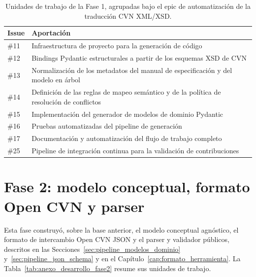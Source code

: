 \begin{table}[htbp]
  \centering
  \footnotesize
  \renewcommand{\arraystretch}{1.45}
  \caption{Unidades de trabajo de la Fase 1, agrupadas bajo el epic de automatización de la traducción CVN XML/XSD.}
  \label{tab:anexo_desarrollo_fase1}
  \begin{tabular}{p{} p{}}
    \hline
    \textbf{Issue} & \textbf{Aportación} \\
    \hline
    \#11 & Infraestructura de proyecto para la generación de código \\
    \#12 & Bindings Pydantic estructurales a partir de los esquemas XSD de CVN \\
    \#13 & Normalización de los metadatos del manual de especificación y del modelo en árbol \\
    \#14 & Definición de las reglas de mapeo semántico y de la política de resolución de conflictos \\
    \#15 & Implementación del generador de modelos de dominio Pydantic \\
    \#16 & Pruebas automatizadas del pipeline de generación \\
    \#17 & Documentación y automatización del flujo de trabajo completo \\
    \#25 & Pipeline de integración continua para la validación de contribuciones \\
    \hline
  \end{tabular}
\end{table}

\section{Fase 2: modelo conceptual, formato Open CVN y parser}
\label{sec:anexo_desarrollo_fase2}

Esta fase construyó, sobre la base anterior, el modelo conceptual agnóstico,
el formato de intercambio Open CVN JSON y el parser y validador públicos,
descritos en las Secciones~\ref{sec:pipeline_modelos_dominio}
y~\ref{sec:pipeline_json_schema} y en el
Capítulo~\ref{cap:formato_herramienta}. La
Tabla~\ref{tab:anexo_desarrollo_fase2} resume sus unidades de trabajo.

